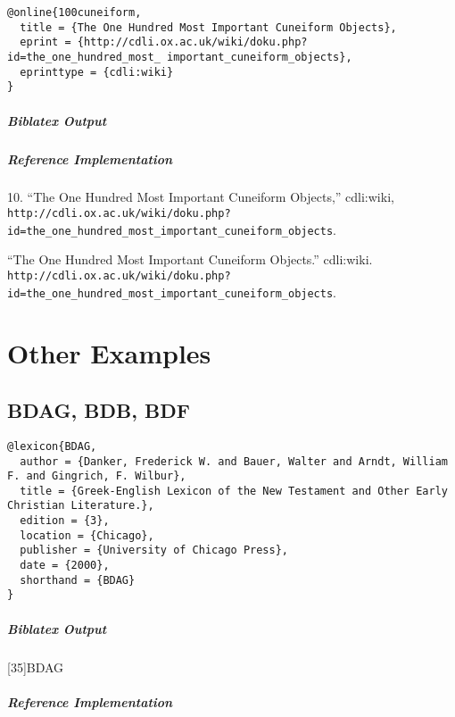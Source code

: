\documentclass[a4paper]{article}
\newenvironment{biboutput}{%
  \subparagraph{Biblatex Output}
}{\color{black}}
\newenvironment{refimp}{%
  \subparagraph{Reference Implementation}
  \color{reference-colour}
  \rm
}{\par\color{black}}
\begin{document}
\begin{lstlisting}
@online{100cuneiform,
  title = {The One Hundred Most Important Cuneiform Objects},
  eprint = {http://cdli.ox.ac.uk/wiki/doku.php?id=the_one_hundred_most_ important_cuneiform_objects},
  eprinttype = {cdli:wiki}
}
\end{lstlisting}

\begin{biboutput}
\end{biboutput}

\begin{refimp}
  \hspace*{\bibindent}10. “The One Hundred Most Important Cuneiform Objects,”
  cdli:wiki,
  \nolinkurl{http://cdli.ox.ac.uk/wiki/doku.php?id=the_one_hundred_most_important_cuneiform_objects}.

  \hangindent\bibindent “The One Hundred Most Important Cuneiform Objects.”
  cdli:wiki.
  \nolinkurl{http://cdli.ox.ac.uk/wiki/doku.php?id=the_one_hundred_most_important_cuneiform_objects}.
\end{refimp}

\section{Other Examples}

\subsection{BDAG, BDB, BDF}

\begin{lstlisting}
@lexicon{BDAG,
  author = {Danker, Frederick W. and Bauer, Walter and Arndt, William F. and Gingrich, F. Wilbur},
  title = {Greek-English Lexicon of the New Testament and Other Early Christian Literature.},
  edition = {3},
  location = {Chicago},
  publisher = {University of Chicago Press},
  date = {2000},
  shorthand = {BDAG}
}
\end{lstlisting}

\begin{biboutput}
  [35]{BDAG}
\end{biboutput}

\begin{refimp}
\end{refimp}
\end{document}
